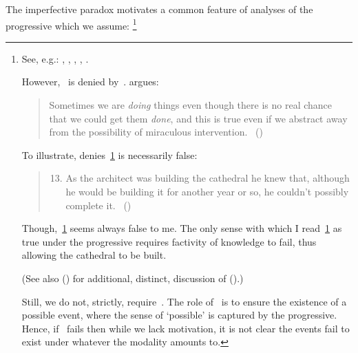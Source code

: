 \begin{note}
  The imperfective paradox motivates a common feature of analyses of the progressive which we assume:%
  \footnote{
    See, e.g.:
    \cite{Bennett:1972uw},
    \cite{Dowty:1979vq},
    \cite{Parsons:1990aa},
    \cite{Landman:1992wh},
    \cite{Portner:1998um}.

    However,~ is denied by~\textcite{Szabo:2004ul}.
    \citeauthor{Szabo:2004ul} argues:
    \begin{quote}
      Sometimes we are \emph{doing} things even though there is no real chance that we could get them \emph{done}, and this is true even if we abstract away from the possibility of miraculous intervention.%
      \mbox{ }\hfill\mbox{(\citeyear[40]{Szabo:2004ul})}
    \end{quote}
    To illustrate, \citeauthor{Szabo:2004ul} denies~\ref{Szabo:Arch} is necessarily false:
    \begin{quote}
      \begin{enumerate}[label=(\arabic*), ref=(\arabic*)]
        \setcounter{enumi}{12}
      \item
        \label{Szabo:Arch}
        As the architect was building the cathedral he knew that, although he would be building it for another year or so, he couldn't possibly complete it.%
        \mbox{ }\hfill\mbox{(\citeyear[38]{Szabo:2004ul})}
      \end{enumerate}
    \end{quote}
    Though,~\ref{Szabo:Arch} seems always false to me.
    The only sense with which I read~\ref{Szabo:Arch} as true under the progressive requires factivity of knowledge to fail, thus allowing the cathedral to be built.

    (See also (\cite[1245]{Portner:2011vi}) for additional, distinct, discussion of (\cite{Szabo:2004ul}).)

    Still, we do not, strictly, require~.
    The role of~ is to ensure the existence of a possible event, where the sense of `possible' is captured by the progressive.
    Hence, if~ fails then while we lack motivation, it is not clear the events fail to exist under whatever the modality amounts to.
  }


\end{note}
